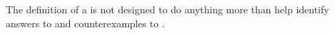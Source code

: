 \begin{note}
  The definition of a \requ{} is not designed to do anything more than help identify answers to \qWhy{} and counterexamples to \issueInclusion{}.
\end{note}






